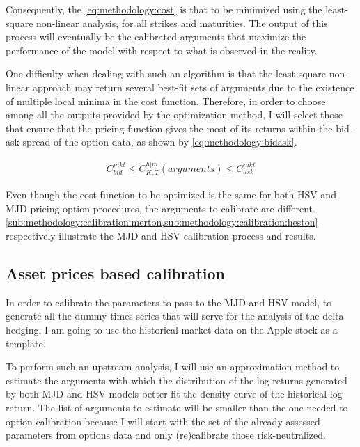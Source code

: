 \documentclass[12pt]{report}
\begin{document}
Consequently, the \cref{eq:methodology:cost} is that to be minimized using the least-square non-linear analysis, for all strikes and maturities.
The output of this process will eventually be the calibrated arguments that maximize the performance of the model with respect to what is observed in the reality.

One difficulty when dealing with such an algorithm is that the least-square non-linear approach may return several best-fit sets of arguments due to the existence of multiple local minima in the cost function.
Therefore, in order to choose among all the outputs provided by the optimization method, I will select those that ensure that the pricing function gives the most of its returns within the bid-ask spread of the option data, as shown by \cref{eq:methodology:bidask}.

\begin{align}
  C_{bid}^{mkt} \leq C_{K,T}^{h|m}(arguments)  \leq C_{ask}^{mkt}
 \label{eq:methodology:bidask}
\end{align}

Even though the cost function to be optimized is the same for both HSV and MJD pricing option procedures, the arguments to calibrate are different. \cref{sub:methodology:calibration:merton,sub:methodology:calibration:heston} respectively illustrate the  MJD and HSV calibration process and results.


\subsection{Asset prices based calibration}
\label{sub:methodology:calibration:asset}

In order to calibrate the parameters to pass to the MJD and HSV model, to generate all the dummy times series that will serve for the analysis of the delta hedging, I am going to use the historical market data on the Apple stock as a template.

To perform such an upstream analysis, I will use an approximation method to estimate the arguments with which the distribution of the log-returns generated by both MJD and HSV models better fit the density curve of the historical log-return.
The list of arguments to estimate will be smaller than the one needed to option calibration because I will start with the set of the already assessed parameters from options data and only (re)calibrate those risk-neutralized.
\end{document}
